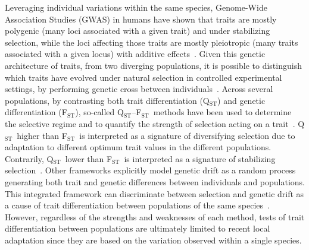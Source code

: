 \documentclass{article}
\newcommand{\Qst}{Q$_\text{ST}$}
\newcommand{\Fst}{F$_\text{ST}$}
\newcommand{\QstFst}{\Qst--\Fst}
\providecommand{\DIFaddtex}[1]{{\protect\color{blue}\uwave{#1}}} %
\providecommand{\DIFaddbegin}{} %
\providecommand{\DIFaddend}{} %
\providecommand{\DIFadd}[1]{\texorpdfstring{\DIFaddtex{#1}}{#1}} %
\newcommand{\DIFaddincludegraphics}[2][]{{\color{blue}\fbox{\DIFOincludegraphics[#1]{#2}}}} %
\DeclareRobustCommand{\DIFaddbegin}{\DIFOaddbegin \let\includegraphics\DIFaddincludegraphics} %
\DeclareRobustCommand{\DIFaddend}{\DIFOaddend \let\includegraphics\DIFOincludegraphics} %
\begin{document}
Leveraging individual variations within the same species, Genome-Wide Association Studies (GWAS) in humans have shown that traits are mostly polygenic (many loci associated with a given trait) and under stabilizing selection, while the loci affecting those traits are mostly pleiotropic (many traits associated with a given locus) with additive effects~\citep{simons_population_2018, sella_thinking_2019}.
Given this genetic architecture of traits, from two diverging populations, it is possible to distinguish which traits have evolved under natural selection in controlled experimental settings, by performing genetic cross between individuals~\citep{fraser_detecting_2020}.
Across several populations, by contrasting both trait differentiation (\Qst) and genetic differentiation (\Fst), so-called \QstFst\ methods have been used to determine the selective regime and to quantify the strength of selection acting on a trait~\citep{merila_comparison_2001, leinonen_comparative_2008}.
\Qst\ higher than \Fst\ is interpreted as a signature of diversifying selection due to adaptation to different optimum trait values in the different populations.
Contrarily, \Qst\ lower than \Fst\ is interpreted as a signature of stabilizing selection~\citep{lamy_qst_2012}.
Other frameworks explicitly model genetic drift as a random process generating both trait and genetic differences between individuals and populations.
This integrated framework can discriminate between selection and genetic drift as a cause of trait differentiation between populations of the same species~\citep{ovaskainen_new_2011}.
However, regardless of the strengths and weaknesses of each method\DIFaddbegin \DIFadd{~}\DIFaddend \citep{pujol_are_2008, edelaar_comparisons_2011, ovaskainen_new_2011}, tests of trait differentiation between populations are ultimately limited to recent local adaptation since they are based on the variation observed within a single species.
\end{document}
